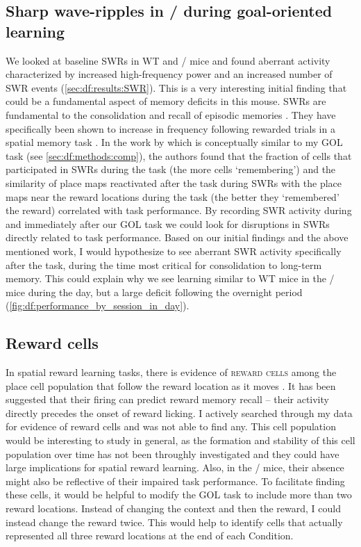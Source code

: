 \subsection{Sharp wave-ripples in \df/ during goal-oriented learning}
We looked at baseline \acp{SWR} in WT and \df/ mice and found aberrant activity characterized by increased high-frequency power and an increased number of \ac{SWR} events (\autoref{sec:df:results:SWR}).
This is a very interesting initial finding that could be a fundamental aspect of memory deficits in this mouse.
SWRs are fundamental to the consolidation and recall of episodic memories \citep[reviewed in,][]{Buzsaki2015}.
They have specifically been shown to increase in frequency following rewarded trials in a spatial memory task \citep{Singer2009}.
In the work by \citeauthor{Dupret2010a} which is conceptually similar to my \ac{GOL} task (see \autoref{sec:df:methods:comp}), the authors found that the fraction of cells that participated in SWRs during the task (the more cells `remembering') and the similarity of place maps reactivated after the task during SWRs with the place maps near the reward locations during the task (the better they `remembered' the reward) correlated with task performance.
By recording \ac{SWR} activity during and immediately after our \ac{GOL} task we could  look for disruptions in SWRs directly related to task performance.
Based on our initial findings and the above mentioned work, I would hypothesize to see aberrant \ac{SWR} activity specifically after the task, during the time most critical for consolidation to long-term memory.
This could explain why we see learning similar to WT mice in the \df/ mice during the day, but a large deficit following the overnight period (\autoref{fig:df:performance_by_session_in_day}).

\subsection{Reward cells}
In spatial reward learning tasks, there is evidence of \textsc{reward cells} among the place cell population that follow the reward location as it moves \citep{Hok2007}.
It has been suggested that their firing can predict reward memory recall -- their activity directly precedes the onset of reward licking.
I actively searched through my data for evidence of reward cells and was not able to find any.
This cell population would be interesting to study in general, as the formation and stability of this cell population over time has not been throughly investigated and they could have large implications for spatial reward learning.
Also, in the \df/ mice, their absence might also be reflective of their impaired task performance.
To facilitate finding these cells, it would be helpful to modify the \ac{GOL} task to include more than two reward locations.
Instead of changing the context and then the reward, I could instead change the reward twice.
This would help to identify cells that actually represented all three reward locations at the end of each Condition.

